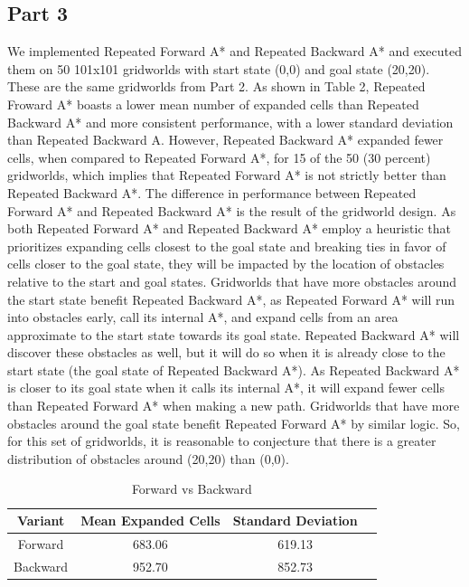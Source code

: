 \documentclass{article}
\begin{document}
\subsection*{Part 3}
We implemented Repeated Forward A* and Repeated Backward A* and executed them on 50 101x101 gridworlds with start state (0,0) and goal state (20,20). These are the same gridworlds from Part 2. As shown in Table 2, Repeated Froward A* boasts a lower mean number of expanded cells than Repeated Backward A* and more consistent performance, with a lower standard deviation than Repeated Backward A. However, Repeated Backward A* expanded fewer cells, when compared to Repeated Forward A*, for 15 of the 50 (30 percent) gridworlds, which implies that Repeated Forward A* is not strictly better than Repeated Backward A*. The difference in performance between Repeated Forward A* and Repeated Backward A* is the result of the gridworld design. As both Repeated Forward A* and Repeated Backward A* employ a heuristic that prioritizes expanding cells closest to the goal state and breaking ties in favor of cells closer to the goal state, they will be impacted by the location of obstacles relative to the start and goal states. Gridworlds that have more obstacles around the start state benefit Repeated Backward A*, as Repeated Forward A* will run into obstacles early, call its internal A*, and expand cells from an area approximate to the start state towards its goal state. Repeated Backward A* will discover these obstacles as well, but it will do so when it is already close to the start state (the goal state of Repeated Backward A*). As Repeated Backward A* is closer to its goal state when it calls its internal A*, it will expand fewer cells than Repeated Forward A* when making a new path. Gridworlds that have more obstacles around the goal state benefit Repeated Forward A* by similar logic. So, for this set of gridworlds, it is reasonable to conjecture that there is a greater distribution of obstacles around (20,20) than (0,0).\\

\begin{table}[!h]
    \centering
    \small
    \begin{tabular}{cccc}
        \hline
         Variant & Mean Expanded Cells & Standard Deviation\\
         \hline
         Forward & 683.06 & 619.13\\
         Backward & 952.70 & 852.73\\
        \hline
    \end{tabular}
    \caption{Forward vs Backward}
    \label{tab:my_label}
\end{table}
\end{document}
